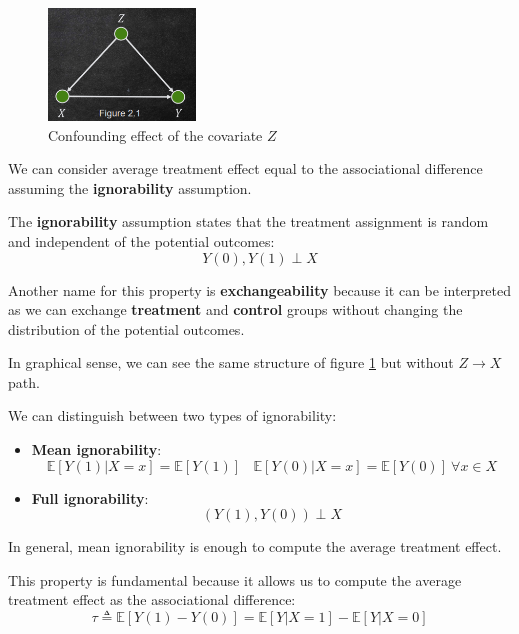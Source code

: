 \begin{figure}[!ht]
    \centering
    \includegraphics[width=0.35\textwidth]{img/confounding.png}
    \caption{Confounding effect of the covariate $Z$}
    \label{fig:confounding}
\end{figure}

We can consider average treatment effect equal to the associational difference
assuming the \textbf{ignorability} assumption.
\begin{definition}[Ignorability]
    The \textbf{ignorability} assumption states that the treatment assignment
    is random and independent of the potential outcomes:
    \begin{equation}
        Y(0), Y(1) \perp X
    \end{equation}
\end{definition}

Another name for this property is \textbf{exchangeability} because it can be
interpreted as we can exchange \textbf{treatment} and \textbf{control} groups without changing the
distribution of the potential outcomes.

In graphical sense, we can see the same structure of figure \ref{fig:confounding}
but without $Z \to X$ path.

We can distinguish between two types of ignorability: 
\begin{itemize}
    \item \textbf{Mean ignorability}:
    \begin{equation*}
        \mathbb{E}[Y(1)|X = x]  =  \mathbb{E}[Y(1)]\ \ \ \
        \mathbb{E}[Y(0)|X = x]  =  \mathbb{E}[Y(0)] \ \forall x \in X 
    \end{equation*}
    \item \textbf{Full ignorability}:
    \begin{equation*}
        (Y(1), Y(0))\perp X
    \end{equation*}
\end{itemize} 
In general, mean ignorability is enough to compute the average
treatment effect.

This property is fundamental because it allows us to compute the average treatment
effect as the associational difference:
\begin{equation*}
    \tau \triangleq \mathbb{E}[Y(1) - Y(0)] = \mathbb{E}[Y|X = 1] - \mathbb{E}[Y|X = 0]
\end{equation*}

